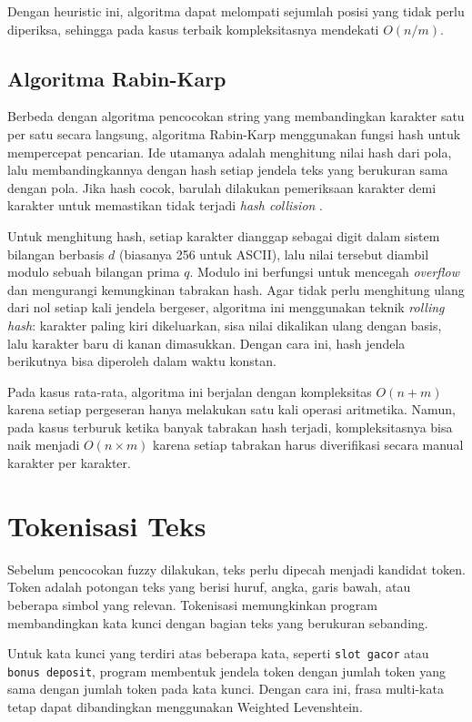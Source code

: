Dengan heuristic ini, algoritma dapat melompati sejumlah posisi yang tidak
perlu diperiksa, sehingga pada kasus terbaik kompleksitasnya mendekati $O(n/m)$.


\subsection{Algoritma Rabin-Karp}

Berbeda dengan algoritma pencocokan string yang membandingkan karakter satu per
satu secara langsung, algoritma Rabin-Karp menggunakan fungsi hash untuk
mempercepat pencarian. Ide utamanya adalah menghitung nilai hash dari pola, lalu
membandingkannya dengan hash setiap jendela teks yang berukuran sama dengan
pola. Jika hash cocok, barulah dilakukan pemeriksaan karakter demi karakter
untuk memastikan tidak terjadi \textit{hash collision}
\cite{geeksforgeeks_rabin_karp}.

Untuk menghitung hash, setiap karakter dianggap sebagai digit dalam sistem
bilangan berbasis $d$ (biasanya 256 untuk ASCII), lalu nilai tersebut diambil
modulo sebuah bilangan prima $q$. Modulo ini berfungsi untuk mencegah
\textit{overflow} dan mengurangi kemungkinan tabrakan hash. Agar tidak perlu
menghitung ulang dari nol setiap kali jendela bergeser, algoritma ini
menggunakan teknik \textit{rolling hash}: karakter paling kiri dikeluarkan,
sisa nilai dikalikan ulang dengan basis, lalu karakter baru di kanan
dimasukkan. Dengan cara ini, hash jendela berikutnya bisa diperoleh dalam waktu
konstan.

Pada kasus rata-rata, algoritma ini berjalan dengan kompleksitas $O(n + m)$
karena setiap pergeseran hanya melakukan satu kali operasi aritmetika. Namun,
pada kasus terburuk ketika banyak tabrakan hash terjadi, kompleksitasnya bisa
naik menjadi $O(n \times m)$ karena setiap tabrakan harus diverifikasi secara
manual karakter per karakter.

\section{Tokenisasi Teks}

Sebelum pencocokan fuzzy dilakukan, teks perlu dipecah menjadi kandidat token.
Token adalah potongan teks yang berisi huruf, angka, garis bawah, atau beberapa
simbol yang relevan. Tokenisasi memungkinkan program membandingkan kata kunci
dengan bagian teks yang berukuran sebanding.

Untuk kata kunci yang terdiri atas beberapa kata, seperti \texttt{slot gacor}
atau \texttt{bonus deposit}, program membentuk jendela token dengan jumlah
token yang sama dengan jumlah token pada kata kunci. Dengan cara ini, frasa
multi-kata tetap dapat dibandingkan menggunakan Weighted Levenshtein.

